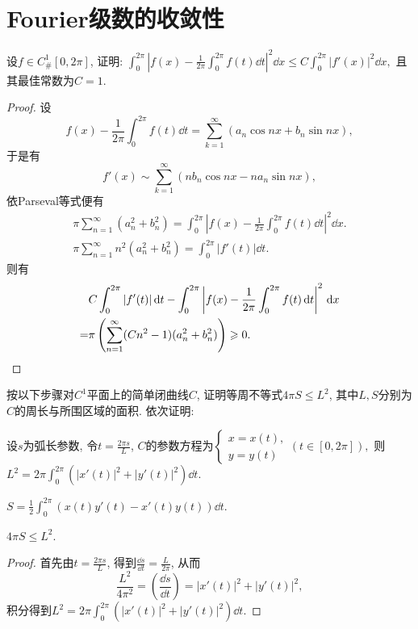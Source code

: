 \section{Fourier级数的收敛性}
\begin{quiza}
\woe 设\(f\in C_{\#}^1[0,2\pi]\), 证明: \(\int_{0}^{2\pi}\left|f(x)-\frac{1}{2\pi}\int_{0}^{2\pi}f(t)\dd t\right|^2\dd x\leqslant C\int_{0}^{2\pi}|f'(x)|^2\dd x,\) 且其最佳常数为\(C=1.\)
\begin{proof}
设\[f(x)-\frac{1}{2\pi}\int_{0}^{2\pi}f(t)\dd t=\sum_{k=1}^{\infty}\left(a_n\cos nx+b_n\sin nx\right),\]于是有\[f'(x)\sim\sum_{k=1}^{\infty}\left(nb_n\cos nx-na_n\sin nx\right),\]依Parseval等式便有\begin{gather*}
\pi\sum_{n=1}^{\infty}\left(a_n^2+b_n^2\right)=\int_{0}^{2\pi}\left|f(x)-\frac{1}{2\pi}\int_{0}^{2\pi}f(t)\dd t\right|^2\dd x.\\
\pi\sum_{n=1}^{\infty}n^2\left(a_n^2+b_n^2\right)=\int_{0}^{2\pi}\left|f'(t)\right|\dd t.
\end{gather*}
则有\[\begin{split}
&C\int_{0}^{2\pi}|f'(t)|\,\mathrm{d} t-\int_{0}^{2\pi}\left|f(x)-\frac{1}{2\pi}\int_{0}^{2\pi}f(t)\,\mathrm{d} t\right|^2\,\mathrm{d} x\\
=&\pi\left(\sum_{n=1}^{\infty}(Cn^2-1)(a_n^2+b_n^2)\right)\geqslant 0.\qedhere
\end{split}\]
\end{proof}
\woe 按以下步骤对\(C^1\)平面上的简单闭曲线\(C\), 证明等周不等式\(4\pi S\leqslant L^2\), 其中\(L,S\)分别为\(C\)的周长与所围区域的面积. 依次证明:
\begin{quizs}
\item 设\(s\)为弧长参数, 令\(t=\frac{2\pi s}{L}\), \(C\)的参数方程为\(\begin{cases}
x=x(t),\\y=y(t)
\end{cases}(t\in [0,2\pi]),\) 则\(L^2=2\pi\int_{0}^{2\pi}\left(|x'(t)|^2+|y'(t)|^2\right)\dd t.\)
\item \(S=\frac{1}{2}\int_{0}^{2\pi}\left(x(t)y'(t)-x'(t)y(t)\right)\dd t\).
\item \(4\pi S\leqslant L^2\).
\end{quizs}
\begin{proof}
首先由\(t=\frac{2\pi s}{L}\), 得到\(\frac{\dd s}{\dd t}=\frac{L}{2\pi}\), 从而\[\frac{L^2}{4\pi^2}=\left(\frac{\dd s}{\dd t}\right)=\left|x'(t)\right|^2+\left|y'(t)\right|^2,\]积分得到\(L^2=2\pi\int_{0}^{2\pi}\left(\left|x'(t)\right|^2+\left|y'(t)\right|^2\right)\dd t.\)


\end{proof}
\end{quiza}
